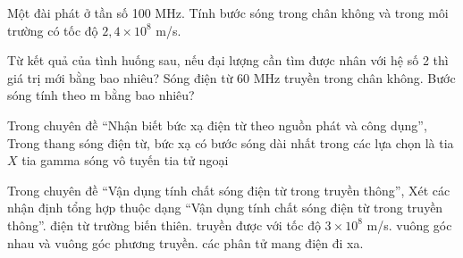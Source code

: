 \begin{ex}
Một đài phát ở tần số 100 MHz. Tính bước sóng trong chân không và trong môi trường có tốc độ $2,4\times10^8$ m/s.
\choiceTF

\end{ex}

\begin{ex}
Từ kết quả của tình huống sau, nếu đại lượng cần tìm được nhân với hệ số 2 thì giá trị mới bằng bao nhiêu? Sóng điện từ 60 MHz truyền trong chân không. Bước sóng tính theo m bằng bao nhiêu?
\end{ex}

\begin{ex}
Trong chuyên đề “Nhận biết bức xạ điện từ theo nguồn phát và công dụng”, Trong thang sóng điện từ, bức xạ có bước sóng dài nhất trong các lựa chọn là
\choice
{tia $X$}
{tia gamma}
{\True sóng vô tuyến}
{tia tử ngoại}
\end{ex}

\begin{ex}
Trong chuyên đề “Vận dụng tính chất sóng điện từ trong truyền thông”, Xét các nhận định tổng hợp thuộc dạng “Vận dụng tính chất sóng điện từ trong truyền thông”.
\choiceTF
{\True điện từ trường biến thiên.}
{\True truyền được với tốc độ $3\times10^8$ m/s.}
{\True vuông góc nhau và vuông góc phương truyền.}
{các phân tử mang điện đi xa.}
\end{ex}

